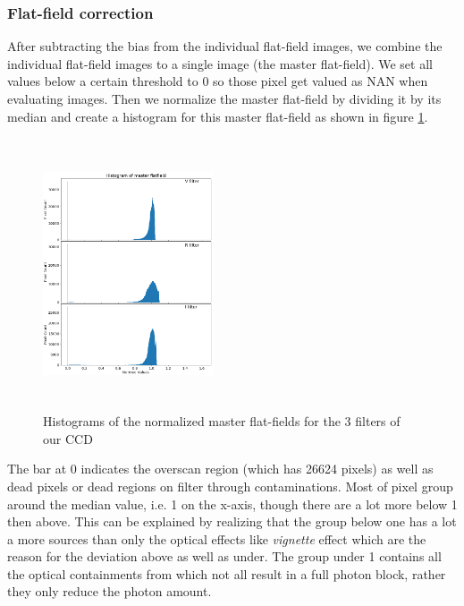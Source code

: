 \subsubsection{Flat-field correction}
After subtracting the bias from the individual flat-field images, we combine the individual flat-field images to a single image (the master flat-field). We set all values below a certain threshold to 0 so those pixel get valued as NAN when evaluating images. Then we normalize the master flat-field by dividing it by its median and create a histogram for this master flat-field as shown in figure \ref{hist}. \\
\begin{figure}
	\centering
	\includegraphics[width=0.45\textwidth, height=8cm]{report_pictures/FlatHist.png}
	\caption{Histograms of the normalized master flat-fields for the 3 filters of our CCD}
	\vspace{-10pt}
	\label{hist}
\end{figure}
The bar at 0 indicates the overscan region (which has 26624 pixels) as well as dead pixels or dead regions on filter through contaminations. Most of pixel group around the median value, i.e. 1 on the x-axis, though there are a lot more below 1 then above. This can be explained by realizing that the group below one has a lot a more sources than only the optical effects like \textit{vignette} effect which are the reason for the deviation above as well as under. The group under 1 contains all the optical containments from which not all result in a full photon block, rather they only reduce the photon amount.
\vspace{4mm}\\
